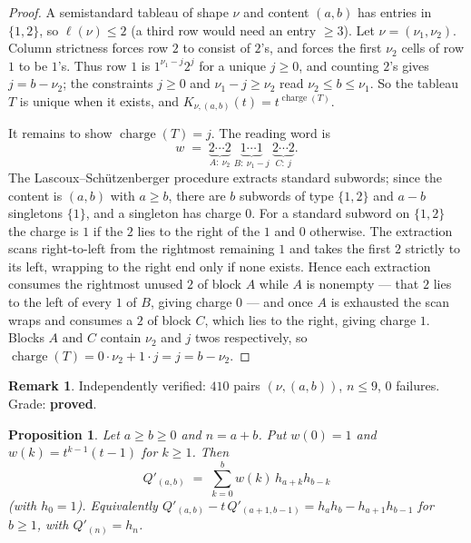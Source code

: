 \documentclass[11pt]{article}
\theoremstyle{plain}
\newtheorem{proposition}[theorem]{Proposition}
\theoremstyle{definition}
\newtheorem{remark}[theorem]{Remark}
\DeclareMathOperator{\ch}{charge}
\newcommand{\Qp}{Q'}
\begin{document}
\begin{proof}
A semistandard tableau of shape $\nu$ and content $(a,b)$ has entries in $\{1,2\}$, so
$\ell(\nu)\le 2$ (a third row would need an entry $\ge 3$). Let $\nu=(\nu_1,\nu_2)$. Column
strictness forces row $2$ to consist of $2$'s, and forces the first $\nu_2$ cells of row $1$ to
be $1$'s. Thus row $1$ is $1^{\nu_1-j}2^{j}$ for a unique $j\ge 0$, and counting $2$'s gives
$j=b-\nu_2$; the constraints $j\ge 0$ and $\nu_1-j\ge\nu_2$ read $\nu_2\le b\le\nu_1$. So the
tableau $T$ is unique when it exists, and $K_{\nu,(a,b)}(t)=t^{\ch(T)}$.

It remains to show $\ch(T)=j$. The reading word is
\[
  w \;=\; \underbrace{2\cdots 2}_{A:\ \nu_2}\ \underbrace{1\cdots 1}_{B:\ \nu_1-j}\
          \underbrace{2\cdots 2}_{C:\ j}.
\]
The Lascoux--Sch\"utzenberger procedure extracts standard subwords; since the content is
$(a,b)$ with $a\ge b$, there are $b$ subwords of type $\{1,2\}$ and $a-b$ singletons $\{1\}$,
and a singleton has charge $0$. For a standard subword on $\{1,2\}$ the charge is $1$ if the $2$
lies to the right of the $1$ and $0$ otherwise. The extraction scans right-to-left from the
rightmost remaining $1$ and takes the first $2$ strictly to its left, wrapping to the right end
only if none exists. Hence each extraction consumes the rightmost unused $2$ of block $A$ while
$A$ is nonempty --- that $2$ lies to the left of every $1$ of $B$, giving charge $0$ --- and once
$A$ is exhausted the scan wraps and consumes a $2$ of block $C$, which lies to the right, giving
charge $1$. Blocks $A$ and $C$ contain $\nu_2$ and $j$ twos respectively, so
$\ch(T)=0\cdot\nu_2+1\cdot j=j=b-\nu_2$.
\end{proof}

\begin{remark}
Independently verified: $410$ pairs $(\nu,(a,b))$, $n\le 9$, $0$ failures. Grade:
\textbf{proved}.
\end{remark}

\begin{proposition}\label{prop:tworow}
Let $a\ge b\ge 0$ and $n=a+b$. Put $w(0)=1$ and $w(k)=t^{k-1}(t-1)$ for $k\ge 1$. Then
\begin{equation}\label{eq:star}
  \Qp_{(a,b)}\;=\;\sum_{k=0}^{b} w(k)\,h_{a+k}h_{b-k}
\end{equation}
(with $h_0=1$). Equivalently
$\Qp_{(a,b)}-t\,\Qp_{(a+1,b-1)}=h_ah_b-h_{a+1}h_{b-1}$ for $b\ge 1$, with
$\Qp_{(n)}=h_n$.
\end{proposition}
\end{document}
